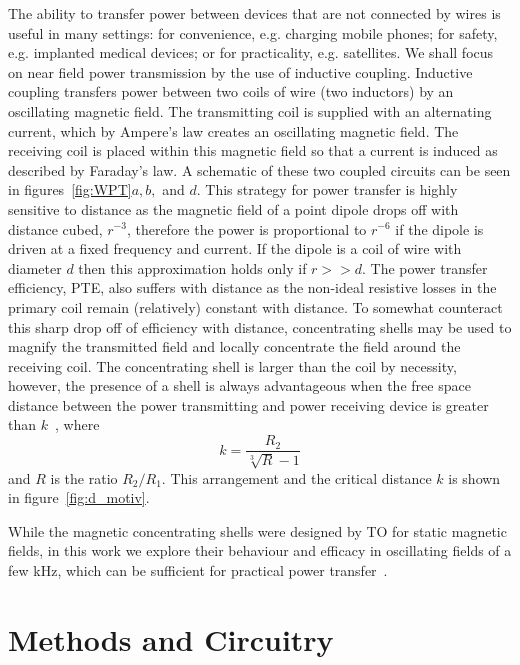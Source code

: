 \documentclass[11pt]{iopart}
\begin{document}
The ability to transfer power between devices that are not connected
by wires is useful in many settings: for convenience, e.g. charging mobile
phones; for safety, e.g. implanted medical devices; or for
practicality, e.g. satellites. We shall focus on near field power
transmission by the use of inductive coupling. Inductive coupling
transfers power between two coils of wire (two inductors) by an
oscillating magnetic field.  The transmitting coil is supplied with an
alternating current, which by Ampere's law creates an oscillating
magnetic field. The receiving coil is placed within this magnetic
field so that a current is induced as described by Faraday's law. A
schematic of these two coupled circuits can be seen in
figures~\ref{fig:WPT}$a, b,$ and $d$. This strategy for power transfer
is highly sensitive to distance as the magnetic field of a point dipole
drops off with distance cubed, $r^{-3}$, therefore the power is
proportional to $r^{-6}$ if the dipole is driven at a fixed frequency
and current. If the dipole is a coil of wire with diameter $d$ then
this approximation holds only if $r>>d$.  The power transfer
efficiency, PTE, also suffers with
distance as the non-ideal resistive losses in the primary coil remain
(relatively) constant with distance. To somewhat counteract this sharp
drop off of efficiency with distance, concentrating shells may be used
to magnify the transmitted field and locally concentrate the field
around the receiving coil. The concentrating shell is larger than
the coil by necessity, however, the presence of a shell is always
advantageous when the free space distance between the power
transmitting and power receiving device is greater than $k$~\cite{Prat2016}, where
\begin{equation}
k = \frac{R_2}{\sqrt[3]{R}-1}
\end{equation}
and $R$ is the ratio $R_2/R_1$. This arrangement and the critical
distance $k$ is shown in figure~\ref{fig:d_motiv}.

While the magnetic concentrating shells were designed by TO for static
magnetic fields, in this work we explore their behaviour and efficacy in
oscillating fields of a few kHz, which can be sufficient for practical
power transfer~\cite{Wang2005}.



\section{Methods and Circuitry}
\end{document}
